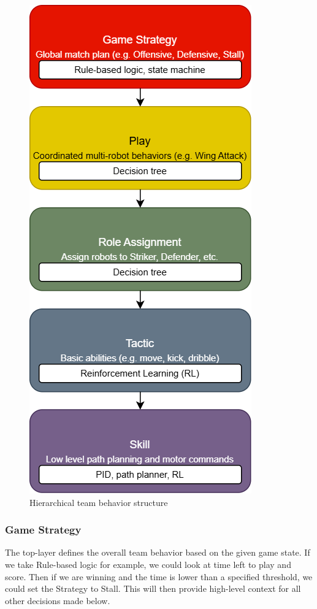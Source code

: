 \begin{figure}[h]
    \centering
    \includegraphics[width=0.8\linewidth]{./StrategyHierarchy.png}
    \caption{Hierarchical team behavior structure}
    \label{fig:strategy_hierarchy}
\end{figure}

\subsubsection{Game Strategy}
The top-layer defines the overall team behavior based on the given game state.
If we take Rule-based logic for example, we could look at time left to play and score.
Then if we are winning and the time is lower than a specified threshold, we could set the Strategy to Stall. This will then provide high-level context for all other decisions made below.

